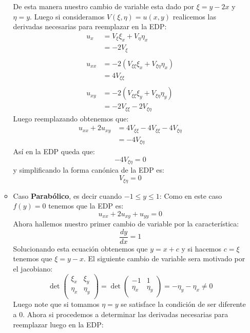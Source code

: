 \begin{homeworkProblem}
\begin{itemize}
\begin{solucion}
\begin{itemize}
                De esta manera nuestro cambio de variable esta dado por $\xi=y-2x$ y $\eta=y$. Luego si consideramos $V(\xi,\eta)=u(x,y)$ realicemos las derivadas necesarias para reemplazar en la EDP:
                \begin{align*}
                    u_x&=V_\xi\xi_x+V_\eta\eta_x\\
                    &=-2V_\xi\\
                    \\
                    u_{xx}&=-2(V_{\xi\xi}\xi_x+V_{\xi\eta}\eta_x)\\
                    &=4V_{\xi\xi}\\
                    \\
                    u_{xy}&=-2(V_{\xi\xi}\xi_y+V_{\xi\eta}\eta_y)\\
                    &=-2V_{\xi\xi}-2V_{\xi\eta}
                \end{align*}
                Luego reemplazando obtenemos que:
                \begin{align*}
                   u_{xx}+2u_{xy}&=4V_{\xi\xi}-4V_{\xi\xi}-4V_{\xi\eta}\\
                   &=-4V_{\xi\eta}
                \end{align*}
                Así en la EDP queda que:
                $$-4V_{\xi\eta}=0$$
                y simplificando la forma canónica de la EDP es:
                $$V_{\xi\eta}=0$$
                \item Caso \textbf{Parabólico}, es decir cuando $-1\leq y\leq 1$: Como en este caso $f(y)=0$ tenemos que la EDP es:
                $$u_{xx}+2u_{xy}+u_{yy}=0$$
                Ahora hallemos nuestro primer cambio de variable por la característica:
                $$\dfrac{dy}{dx}=1$$
                Solucionando esta ecuación obtenemos que $y=x+c$ y si hacemos $c=\xi$ tenemos que $\xi=y-x$. El siguiente cambio de variable sera motivado por el jacobiano:
                $$\det\begin{pmatrix}
                    \xi_x&\xi_y\\
                    \eta_x&\eta_y\\
                \end{pmatrix}=\det\begin{pmatrix}
                    -1&1\\
                    \eta_x&\eta_y\\
                \end{pmatrix}=-\eta_y-\eta_x\neq 0$$
             Luego note que si tomamos $\eta=y$ se satisface la condición de ser diferente a 0. Ahora si procedemos a determinar las derivadas necesarias para reemplazar luego en la EDP:

\end{itemize}
\end{solucion}
\end{itemize}
\end{homeworkProblem}
